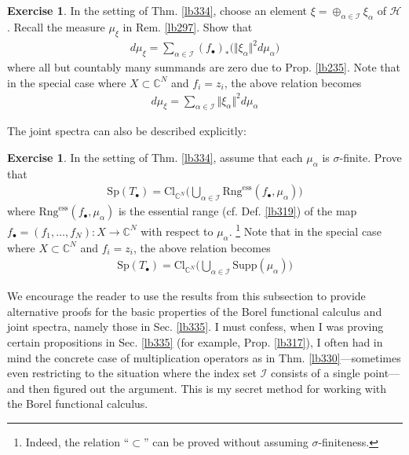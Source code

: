 \documentclass[12pt,b5paper,notitlepage]{article}
\theoremstyle{definition}
\newtheorem{exe}[df]{Exercise}
\theoremstyle{plain}
\newcommand{\blt}{\bullet}
\newcommand{\Cbb}{\mathbb C}
\newcommand{\Sp}{\mathrm{Sp}}
\newcommand{\Supp}{\mathrm{Supp}}
\newcommand{\Cl}{\mathrm{Cl}}
\newcommand{\Ess}{\mathrm{Rng}^{\mathrm{ess}}}
\newcommand{\MH}{\mathcal H}
\newcommand{\SI}{\mathscr I}
\numberwithin{equation}{section}
\begin{document}
\begin{exe}
In the setting of Thm. \ref{lb334}, choose an element $\xi=\oplus_{\alpha\in\SI}\xi_\alpha$ of $\MH$. Recall the measure $\mu_\xi$ in Rem. \ref{lb297}. Show that
\begin{align}
d\mu_\xi=\sum_{\alpha\in\SI}(f_\blt)_*\big(\Vert\xi_\alpha\Vert^2d\mu_\alpha\big)
\end{align}
where all but countably many summands are zero due to Prop. \ref{lb235}. Note that in the special case where $X\subset\Cbb^N$ and $f_i=z_i$, the above relation becomes
\begin{align}
d\mu_\xi=\sum_{\alpha\in\SI}\Vert\xi_\alpha\Vert^2d\mu_\alpha
\end{align}
\end{exe}



The joint spectra can also be described explicitly:


\begin{exe}
In the setting of Thm. \ref{lb334}, assume that each $\mu_\alpha$ is $\sigma$-finite. Prove that
\begin{align}
\Sp(T_\blt)= \Cl_{\Cbb^N}\Big(\bigcup_{\alpha\in\SI}\Ess(f_\blt,\mu_\alpha)\Big)
\end{align}
where $\Ess(f_\blt,\mu_\alpha)$ is the essential range (cf. Def. \ref{lb319}) of the map $f_\blt=(f_1,\dots,f_N):X\rightarrow\Cbb^N$ with respect to $\mu_\alpha$. \footnote{Indeed, the relation ``$\subset$'' can be proved without assuming $\sigma$-finiteness.} Note that in the special case where $X\subset\Cbb^N$ and $f_i=z_i$, the above relation becomes
\begin{align}
\Sp(T_\blt)= \Cl_{\Cbb^N}\Big(\bigcup_{\alpha\in\SI}\Supp(\mu_\alpha)\Big)
\end{align}
\end{exe}


We encourage the reader to use the results from this subsection to provide alternative proofs for the basic properties of the Borel functional calculus and joint spectra, namely those in Sec. \ref{lb335}. I must confess, when I was proving certain propositions in Sec. \ref{lb335} (for example, Prop. \ref{lb317}), I often had in mind the concrete case of multiplication operators as in Thm. \ref{lb330}---sometimes even restricting to the situation where the index set $\SI$ consists of a single point---and then figured out the argument. This is my secret method for working with the Borel functional calculus.
\end{document}
